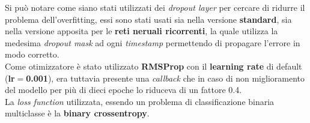 Si può notare come siano stati utilizzati dei \textit{dropout layer} per cercare di ridurre il problema dell'overfitting, essi sono stati usati sia nella versione \textbf{standard}, sia nella versione apposita per le \textbf{reti neruali ricorrenti}, la quale utilizza la medesima \textit{dropout mask} ad ogni \textit{timestamp} permettendo di propagare l'errore in modo corretto. \cite{DeepLearningPython}
\\Come otimizzatore è stato utilizzato \textbf{RMSProp} con il \textbf{learning rate} di default (\textbf{lr$=$0.001}), era tuttavia presente una \textit{callback} che in caso di non miglioramento del modello per più di dieci epoche lo riduceva di un fattore 0.4.
\\La \textit{loss function} utilizzata, essendo un problema di classificazione binaria multiclasse è la \textbf{binary crossentropy}.